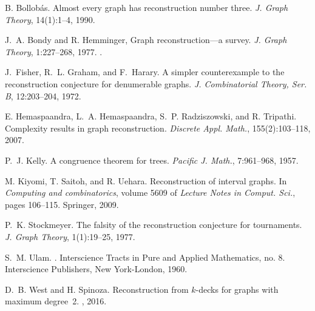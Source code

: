 \documentclass[12pt]{article}
\begin{document}
\begin{thebibliography}{99}

 B. Bollob{\'a}s. \newblock Almost every
  graph has reconstruction number three. \newblock \emph{J. Graph Theory},
  14(1):1--4, 1990.

 J.~A. Bondy and R. Hemminger,
\newblock Graph reconstruction---a survey.
\emph{J. Graph Theory}, 1:227--268, 1977. .

 J.~Fisher, R.~L. Graham, and F.~Harary. \newblock A
  simpler counterexample to the reconstruction conjecture for
  denumerable graphs. \newblock \emph{J. Combinatorial Theory, Ser. B},
  12:203--204, 1972.

 E. Hemaspaandra, L.~A. Hemaspaandra,
  S.~P. Radziszowski, and R. Tripathi. \newblock
  Complexity results in graph reconstruction. \newblock \emph{Discrete
    Appl. Math.}, 155(2):103--118, 2007.

 P.~J. Kelly. \newblock A congruence theorem for
  trees. \newblock \emph{Pacific J. Math.}, 7:961--968, 1957.

 M. Kiyomi, T. Saitoh, and R. Uehara.
  \newblock Reconstruction of interval graphs. \newblock In 
    \emph{Computing and combinatorics}, volume 5609 of
    \emph{Lecture Notes in Comput. Sci.}, pages 106--115. Springer, 2009.

 P.~K. Stockmeyer. \newblock The falsity of the
  reconstruction conjecture for tournaments. \newblock \emph{J. Graph
    Theory}, 1(1):19--25, 1977.

 S.~M. Ulam. \newblock {}. \newblock Interscience Tracts in Pure and
  Applied Mathematics, no. 8.  Interscience Publishers, New
  York-London, 1960.
  
 D.~B. West and H. Spinoza.
 \newblock Reconstruction from $k$-decks for graphs with maximum degree~2.
 \newblock {}, 2016.

\end{thebibliography}
\end{document}
